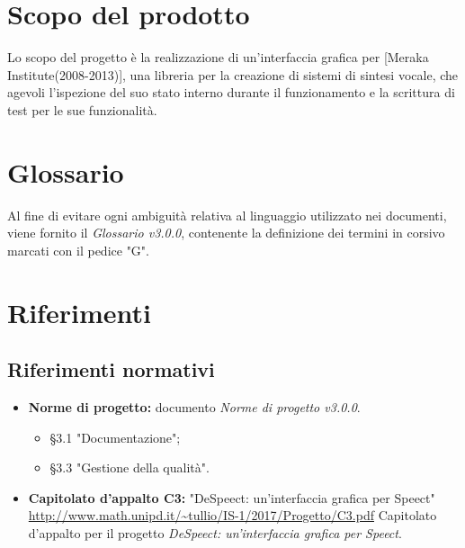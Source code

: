 \documentclass[openany,12pt,a4paper]{report}
\begin{document}
    \section{Scopo del prodotto}
    
    Lo scopo del progetto è la realizzazione di un’interfaccia grafica per  [Meraka Institute(2008-2013)], una libreria per la creazione di sistemi di sintesi vocale, che agevoli l’ispezione del suo stato interno durante il funzionamento e la scrittura di test per le sue funzionalità.
    
    \section{Glossario}
    
    Al fine di evitare ogni ambiguità relativa al linguaggio utilizzato nei documenti, viene fornito il \textit{Glossario v3.0.0}, contenente la definizione dei termini in corsivo marcati con il pedice "G".
    
    \section{Riferimenti}
    
    \subsection*{Riferimenti normativi}
    
    \begin{itemize}
    
        \item \textbf{Norme di progetto:} documento \textit{Norme di progetto v3.0.0}.
	        \begin{itemize}
	        	\item §3.1 "Documentazione";
	        	\item §3.3 "Gestione della qualità".
	        \end{itemize}
        
        \item\textbf{Capitolato d'appalto C3:} "DeSpeect: un'interfaccia grafica per Speect" \\ \url{http://www.math.unipd.it/~tullio/IS-1/2017/Progetto/C3.pdf}
        	\subitem Capitolato d'appalto per il progetto \textit{DeSpeect: un'interfaccia grafica per Speect}.
    
    \end{itemize}
    
\end{document}
